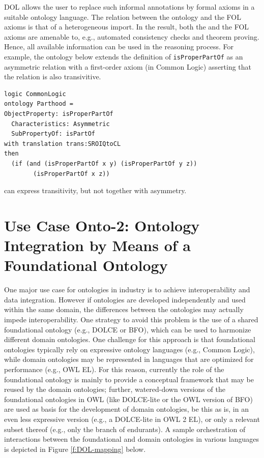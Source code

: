 \documentclass[10pt,fleqn,%
\ifpretendfinal
final%
\else
draft%
\fi,
]{scrreprt}
\begin{document}
DOL allows the user to replace such informal annotations by formal axioms in a suitable ontology 
language. The relation between the \OWL ontology and the FOL axioms is that of a heterogeneous 
import. In the result, both the \OWL and the FOL axioms are amenable to, e.g., automated consistency 
checks and theorem proving. Hence, all available information can be used in the reasoning process.
For example, the ontology below extends the \OWL definition of \texttt{isProperPartOf} as an asymmetric relation
with a first-order axiom (in Common Logic) asserting that the relation is also transivitive.
\begin{lstlisting}[basicstyle=\small\ttfamily,language=dolText,morekeywords={logic,ontology,props,ObjectProperty,Class,DisjointUnionOf,SubClassOf,Characteristics,Transitive,Asymmetric,SubPropertyOf,DisjointClasses,EquivalentTo,inverse,only,forall,iff,if,or,exists},escapechar=@,mathescape]
logic CommonLogic
ontology Parthood =
ObjectProperty: isProperPartOf  
  Characteristics: Asymmetric  
  SubPropertyOf: isPartOf 
with translation trans:SROIQtoCL
then
  (if (and (isProperPartOf x y) (isProperPartOf y z)) 
        (isProperPartOf x z))
\end{lstlisting}
\OWL can express transitivity, but not together with asymmetry.

\section{Use Case Onto-2: Ontology Integration by Means of a Foundational Ontology}
One major use case for ontologies in industry is to achieve interoperability and data integration. 
However if ontologies are developed independently and used  within the same domain, the 
differences between the ontologies may actually impede interoperability. One strategy to avoid this 
problem is the use of a shared  foundational ontology (e.g., DOLCE or BFO), which can be used to 
harmonize different domain ontologies. One challenge for this approach is that foundational 
ontologies typically rely on expressive ontology languages (e.g., Common Logic), while domain 
ontologies may be represented in languages that are optimized for performance (e.g., OWL EL). For 
this reason, currently the role of the foundational ontology is mainly to provide a conceptual 
framework that may be reused by the  domain ontologies; further, watered-down versions of the 
foundational ontologies in OWL (like DOLCE-lite or the OWL version of BFO) are used as basis for 
the  development of domain ontologies, be this as is, in an even less expressive version (e.g., a 
DOLCE-lite in OWL 2 EL), or only a relevant subset thereof (e.g., only the branch of endurants). A 
sample orchestration of interactions between the foundational and domain ontologies in various 
languages is depicted in Figure \ref{f:DOL-mapping} below.
\end{document}
